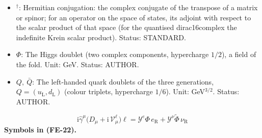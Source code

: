 \documentclass[
  10pt,
]{article}
\begin{document}
\begin{itemize}
  neutrinos. Unit: dimensionless. Status: STANDARD.
\item
  \({}^\dagger\): Hermitian conjugation: the complex conjugate of the
  transpose of a matrix or spinor; for an operator on the space of
  states, its adjoint with respect to the scalar product of that space
  (for the quantised dirac16complex the indefinite Krein scalar
  product). Status: STANDARD.
\item
  \(\Phi\): The Higgs doublet (two complex components, hypercharge
  \(1/2\)), a field of the fold. Unit: GeV. Status: AUTHOR.
\item
  \(Q,\ \bar Q\): The left-handed quark doublets of the three
  generations, \(Q = (u_{\mathrm{L}}, d_{\mathrm{L}})\) (colour
  triplets, hypercharge \(1/6\)). Unit: GeV\(^{3/2}\). Status: AUTHOR.
\end{itemize}

\[
\mathrm{i}\hat\gamma^\mu\big(D_\mu + \mathrm{i}\,\mathcal{V}^{\ell}_\mu\big)\ell = \mathcal{Y}^{e}\Phi\,e_{\mathrm{R}}
 + \mathcal{Y}^{\nu}\tilde\Phi\,\nu_{\mathrm{R}} \tag{FE-22}
\] \textbf{Symbols in (FE-22).}
\end{document}
